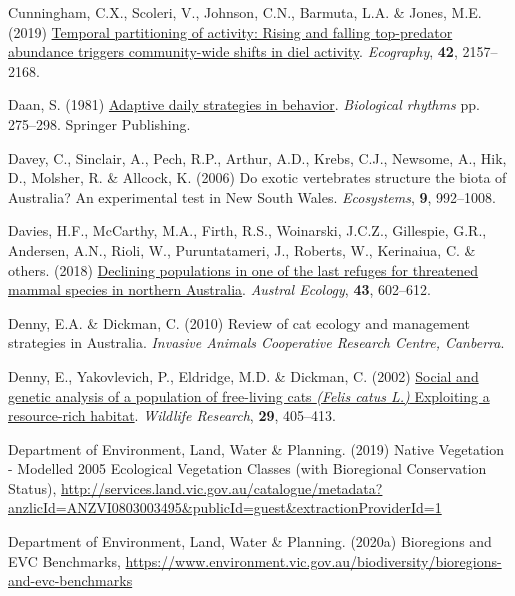 \documentclass[11pt,a4paper,titlepage,twoside,openright]{style/unimelbthesis}
\newenvironment{CSLReferences}%
  {}%
  {\par}
\begin{document}
\begin{mainmatter}
\begin{CSLReferences}{1}{0}
\leavevmode{}%
Cunningham, C.X., Scoleri, V., Johnson, C.N., Barmuta, L.A. \& Jones, M.E. (2019) \href{https://doi.org/10.1111/ecog.04485}{Temporal partitioning of activity: Rising and falling top-predator abundance triggers community-wide shifts in diel activity}. \emph{Ecography}, \textbf{42}, 2157--2168.

\leavevmode{}%
Daan, S. (1981) \href{https://doi.org/10.1007/978-1-4615-6552-9_15}{Adaptive daily strategies in behavior}. \emph{Biological rhythms} pp. 275--298. Springer Publishing.

\leavevmode{}%
Davey, C., Sinclair, A., Pech, R.P., Arthur, A.D., Krebs, C.J., Newsome, A., Hik, D., Molsher, R. \& Allcock, K. (2006) Do exotic vertebrates structure the biota of {{A}ustralia}? An experimental test in {New South Wales}. \emph{Ecosystems}, \textbf{9}, 992--1008.

\leavevmode{}%
Davies, H.F., McCarthy, M.A., Firth, R.S., Woinarski, J.C.Z., Gillespie, G.R., Andersen, A.N., Rioli, W., Puruntatameri, J., Roberts, W., Kerinaiua, C. \& others. (2018) \href{https://doi.org/10.1111/aec.12596}{Declining populations in one of the last refuges for threatened mammal species in northern {A}ustralia}. \emph{Austral Ecology}, \textbf{43}, 602--612.

\leavevmode{}%
Denny, E.A. \& Dickman, C. (2010) Review of cat ecology and management strategies in {A}ustralia. \emph{Invasive Animals Cooperative Research Centre, Canberra}.

\leavevmode{}%
Denny, E., Yakovlevich, P., Eldridge, M.D. \& Dickman, C. (2002) \href{https://doi.org/10.1071/WR02092}{Social and genetic analysis of a population of free-living cats \emph{({Felis catus L.})} Exploiting a resource-rich habitat}. \emph{Wildlife Research}, \textbf{29}, 405--413.

\leavevmode{}%
Department of Environment, Land, Water \& Planning. (2019) {Native Vegetation - Modelled 2005 Ecological Vegetation Classes (with Bioregional Conservation Status)}, \url{http://services.land.vic.gov.au/catalogue/metadata?anzlicId=ANZVI0803003495\&publicId=guest\&extractionProviderId=1}

\leavevmode{}%
Department of Environment, Land, Water \& Planning. (2020a) {Bioregions and EVC Benchmarks}, \url{https://www.environment.vic.gov.au/biodiversity/bioregions-and-evc-benchmarks}


\end{CSLReferences}
\end{mainmatter}
\end{document}

